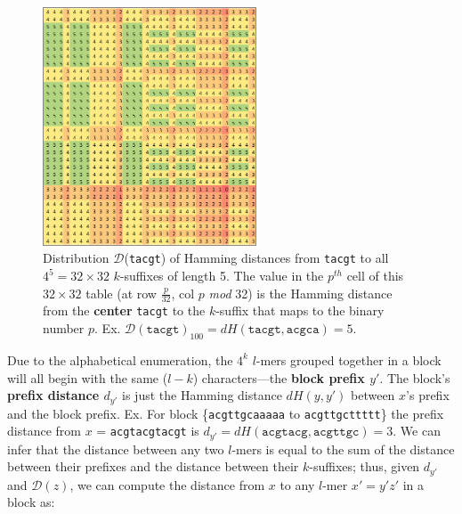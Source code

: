 \documentclass{acm_proc_article-sp}
\begin{document}
\begin{enumerate}
\begin{figure}[h]
				\centering
				\label{fig:distribution}
				\includegraphics[width=2.5in]{img/D(tacgt)}
				\caption{\small
					Distribution $\mathcal{D}$(\texttt{tacgt}) of Hamming distances from \texttt{tacgt} 
					to all $4^{5} = 32\times32$ $k$-suffixes of length 5.
					The value in the $p^{th}$ cell of this $32\times32$ table (at row $\frac{p}{32}$, col $p$ \emph{mod} 32) is the Hamming distance from the \textbf{center} \texttt{tacgt} to the $k$-suffix that maps to the binary number $p$.\newline
					Ex. $\mathcal{D}(\texttt{tacgt})_{100} = dH(\texttt{tacgt}, \texttt{acgca}) = 5$.\newline
				}
				\end{figure}\newline
			Due to the alphabetical enumeration, the $4^{k}$ $l$-mers grouped together in a block will all begin with the same ($l-k$) characters---the {\boldmath\bf block prefix $y'$}. The block's {\boldmath\bf prefix distance $d_{y'}$} is just the Hamming distance $dH(y,y')$ between $x$'s prefix and the block prefix.\newline\newline
				{\small
					Ex. For block \{\texttt{acgttgcaaaaa} to \texttt{acgttgcttttt}\}\newline
					\hspace*{18pt} the prefix distance from $x$ = \texttt{acgtacgtacgt} is\newline
					\hspace*{21pt} $d_{y'} = dH(\texttt{acgtacg}, \texttt{acgttgc}) = 3$. } \newline\newline
			We can infer that the distance between any two $l$-mers is equal to the sum of the distance between their prefixes and the distance between their $k$-suffixes; thus, given $d_{y'}$ and $\mathcal{D}(z)$, we can compute the distance from $x$ to any $l$-mer $x' = y'z'$ in a block as:

\end{enumerate}
\end{document}
